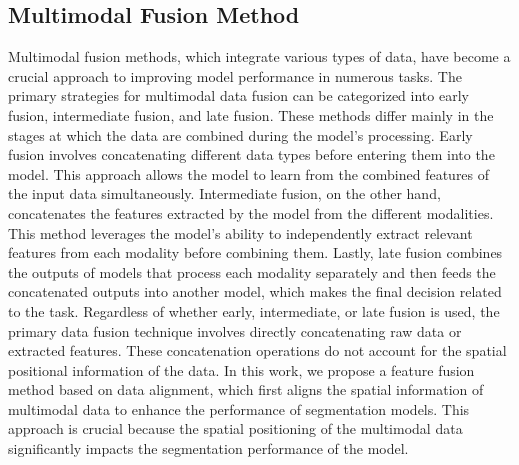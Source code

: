 \subsection{Multimodal Fusion Method}
Multimodal fusion methods, which integrate various types of data, have become a crucial approach to improving model performance in numerous tasks\cite{stahlschmidt2022multimodal}. The primary strategies for multimodal data fusion can be categorized into early fusion, intermediate fusion, and late fusion. These methods differ mainly in the stages at which the data are combined during the model's processing. Early fusion involves concatenating different data types before entering them into the model\cite{rajalingam2017multimodality,ronen2019evaluation,albaradei2021metacancer}. This approach allows the model to learn from the combined features of the input data simultaneously\cite{venugopalan2021multimodal,he2021imageomics,he2021imageomics,mobadersany2018predicting}. Intermediate fusion, on the other hand, concatenates the features extracted by the model from the different modalities. This method leverages the model's ability to independently extract relevant features from each modality before combining them. Lastly, late fusion combines the outputs of models that process each modality separately and then feeds the concatenated outputs into another model, which makes the final decision related to the task\cite{deng2020multimodal,huang2020multimodal,huang2020multimodal}. Regardless of whether early, intermediate, or late fusion is used, the primary data fusion technique involves directly concatenating raw data or extracted features. These concatenation operations do not account for the spatial positional information of the data. In this work, we propose a feature fusion method based on data alignment, which first aligns the spatial information of multimodal data to enhance the performance of segmentation models. This approach is crucial because the spatial positioning of the multimodal data significantly impacts the segmentation performance of the model. 

